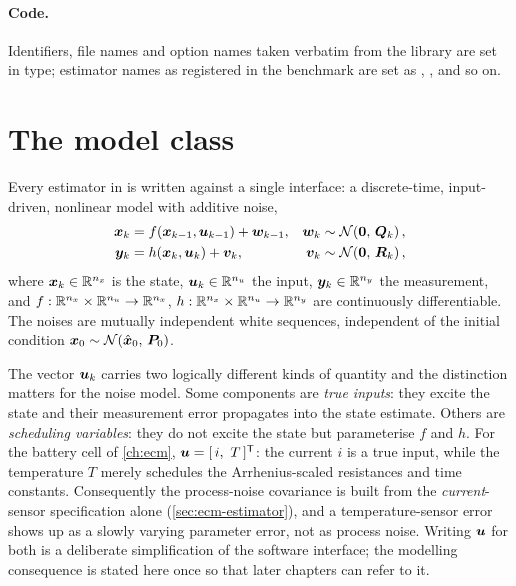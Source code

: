 \paragraph{Code.} Identifiers, file names and option names taken verbatim from the library are
set in  type; estimator names as registered in the benchmark are set as
, , and so on.

\section{The model class}
\label{sec:prelim-model}

Every estimator in \estkit{} is written against a single interface: a discrete-time,
input-driven, nonlinear model with additive noise,
\begin{align}
\bm{x}_{k}   &= f(\bm{x}_{k-1}, \bm{u}_{k-1}) + \bm{w}_{k-1}, & \bm{w}_k &\sim \mathcal{N}\!\left(\bm 0,\,\bm{Q}_k\right),
  \label{eq:prelim-proc}\\
\bm{y}_{k}   &= h(\bm{x}_{k}, \bm{u}_{k}) + \bm{v}_{k},       & \bm{v}_k &\sim \mathcal{N}\!\left(\bm 0,\,\bm{R}_k\right),
  \label{eq:prelim-meas}
\end{align}
where $\bm{x}_k\in\mathbb{R}^{n_x}$ is the state, $\bm{u}_k\in\mathbb{R}^{n_u}$ the input, $\bm{y}_k\in\mathbb{R}^{n_y}$
the measurement, and $f:\mathbb{R}^{n_x}\times\mathbb{R}^{n_u}\to\mathbb{R}^{n_x}$,
$h:\mathbb{R}^{n_x}\times\mathbb{R}^{n_u}\to\mathbb{R}^{n_y}$ are continuously differentiable. The noises are
mutually independent white sequences, independent of the initial condition
$\bm{x}_0\sim\mathcal{N}\!\left(\hat{\bm{x}}_0,\,\bm{P}_0\right)$.

\begin{remark}\label{rem:prelim-sched}
The vector $\bm{u}_k$ carries two logically different kinds of quantity and the distinction matters
for the noise model. Some components are \emph{true inputs}: they excite the state and their
measurement error propagates into the state estimate. Others are \emph{scheduling variables}:
they do not excite the state but parameterise $f$ and $h$. For the battery cell of
\cref{ch:ecm}, $\bm{u} = [\,i,\ T\,]^{\mathsf{T}}$: the current $i$ is a true input, while the temperature
$T$ merely schedules the Arrhenius-scaled resistances and time constants. Consequently the
process-noise covariance is built from the \emph{current}-sensor specification alone
(\cref{sec:ecm-estimator}), and a temperature-sensor error shows up as a slowly varying
parameter error, not as process noise. Writing $\bm{u}$ for both is a deliberate simplification
of the software interface; the modelling consequence is stated here once so that later chapters
can refer to it.
\end{remark}

